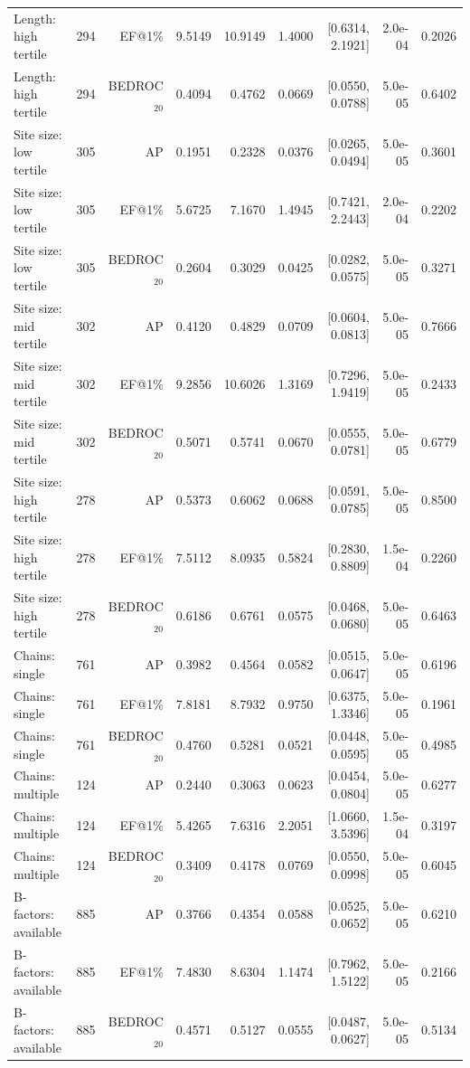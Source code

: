 \begin{table}[t]
\begin{tabular}{lrrrrrrrr}
Length: high tertile & 294 & EF@1\% & 9.5149 & 10.9149 & 1.4000 & [0.6314, 2.1921] & 2.0e-04 & 0.2026 \\
Length: high tertile & 294 & BEDROC$_{20}$ & 0.4094 & 0.4762 & 0.0669 & [0.0550, 0.0788] & 5.0e-05 & 0.6402 \\
Site size: low tertile & 305 & AP & 0.1951 & 0.2328 & 0.0376 & [0.0265, 0.0494] & 5.0e-05 & 0.3601 \\
Site size: low tertile & 305 & EF@1\% & 5.6725 & 7.1670 & 1.4945 & [0.7421, 2.2443] & 2.0e-04 & 0.2202 \\
Site size: low tertile & 305 & BEDROC$_{20}$ & 0.2604 & 0.3029 & 0.0425 & [0.0282, 0.0575] & 5.0e-05 & 0.3271 \\
Site size: mid tertile & 302 & AP & 0.4120 & 0.4829 & 0.0709 & [0.0604, 0.0813] & 5.0e-05 & 0.7666 \\
Site size: mid tertile & 302 & EF@1\% & 9.2856 & 10.6026 & 1.3169 & [0.7296, 1.9419] & 5.0e-05 & 0.2433 \\
Site size: mid tertile & 302 & BEDROC$_{20}$ & 0.5071 & 0.5741 & 0.0670 & [0.0555, 0.0781] & 5.0e-05 & 0.6779 \\
Site size: high tertile & 278 & AP & 0.5373 & 0.6062 & 0.0688 & [0.0591, 0.0785] & 5.0e-05 & 0.8500 \\
Site size: high tertile & 278 & EF@1\% & 7.5112 & 8.0935 & 0.5824 & [0.2830, 0.8809] & 1.5e-04 & 0.2260 \\
Site size: high tertile & 278 & BEDROC$_{20}$ & 0.6186 & 0.6761 & 0.0575 & [0.0468, 0.0680] & 5.0e-05 & 0.6463 \\
Chains: single & 761 & AP & 0.3982 & 0.4564 & 0.0582 & [0.0515, 0.0647] & 5.0e-05 & 0.6196 \\
Chains: single & 761 & EF@1\% & 7.8181 & 8.7932 & 0.9750 & [0.6375, 1.3346] & 5.0e-05 & 0.1961 \\
Chains: single & 761 & BEDROC$_{20}$ & 0.4760 & 0.5281 & 0.0521 & [0.0448, 0.0595] & 5.0e-05 & 0.4985 \\
Chains: multiple & 124 & AP & 0.2440 & 0.3063 & 0.0623 & [0.0454, 0.0804] & 5.0e-05 & 0.6277 \\
Chains: multiple & 124 & EF@1\% & 5.4265 & 7.6316 & 2.2051 & [1.0660, 3.5396] & 1.5e-04 & 0.3197 \\
Chains: multiple & 124 & BEDROC$_{20}$ & 0.3409 & 0.4178 & 0.0769 & [0.0550, 0.0998] & 5.0e-05 & 0.6045 \\
B-factors: available & 885 & AP & 0.3766 & 0.4354 & 0.0588 & [0.0525, 0.0652] & 5.0e-05 & 0.6210 \\
B-factors: available & 885 & EF@1\% & 7.4830 & 8.6304 & 1.1474 & [0.7962, 1.5122] & 5.0e-05 & 0.2166 \\
B-factors: available & 885 & BEDROC$_{20}$ & 0.4571 & 0.5127 & 0.0555 & [0.0487, 0.0627] & 5.0e-05 & 0.5134 \\
\bottomrule
\end{tabular}
\end{table}
